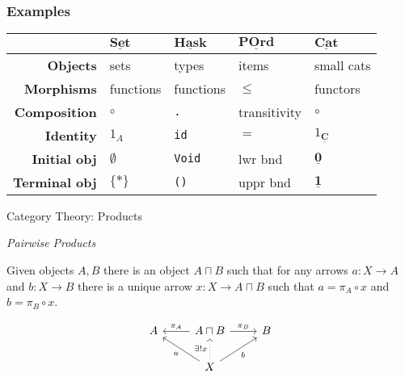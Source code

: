 \documentclass[10pt]{beamer}
\newcommand{\Cat}[1]{\ensuremath{\underline{\mathbf{#1}}}}
\theoremstyle{definition}
\theoremstyle{remark}
\numberwithin{equation}{section}
\begin{document}
\begin{frame}[fragile]
  \frametitle{Examples}
  \begin{tabular}{r l l l l}\toprule
    & $\Cat{Set}$ & $\Cat{Hask}$ & $\Cat{POrd}$ & $\Cat{Cat}$ \\\midrule
    \textbf{Objects} & sets & types & items & small cats \\
    \textbf{Morphisms} & functions & functions & $\leq$ & functors \\
    \textbf{Composition} & $\circ$ & \texttt{.} & transitivity & $\circ$ \\
    \textbf{Identity} & $1_A$ & \texttt{id} & $=$ & $1_{\Cat{C}}$ \\
    \textbf{Initial obj\rlap{.}} & $\emptyset$ & \texttt{Void} & lwr bnd & $\Cat{0}$ \\
    \textbf{Terminal obj\rlap{.}} & $\{*\}$ & \texttt{()} & uppr bnd & $\Cat{1}$ \\\bottomrule
  \end{tabular}
\end{frame}

\begin{frame}[fragile]{Category Theory: Products}

  \emph{Pairwise Products}

  Given objects $A,B$ there is an object $A\sqcap B$ such that for any arrows $a : X \rightarrow A$ and $b : X \rightarrow B$ there is a unique arrow $x : X \rightarrow A\sqcap B$ such that $a = \pi_A \circ x$ and $b = \pi_B \circ x$.

  \[
  \begin{tikzcd}
    A & A\sqcap B \arrow[swap]{l}{\pi_{A}} \arrow{r}{\pi_{B}} & B \\
    & X \arrow[dotted]{u}{\exists! x} \arrow{ul}{a} \arrow[swap]{ur}{b} & \\
  \end{tikzcd}
  \]


\end{frame}
\end{document}
